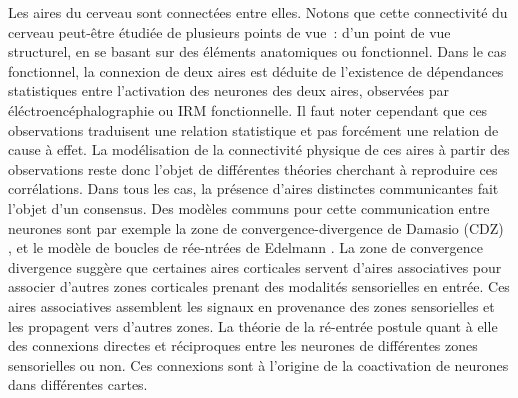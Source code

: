 \documentclass[../main]{subfiles}
\begin{document}
Les aires du cerveau sont connectées entre elles. Notons que cette connectivité du cerveau peut-être étudiée de plusieurs points de vue~: d'un point de vue structurel, en se basant sur des éléments anatomiques ou fonctionnel.
Dans le cas fonctionnel, la connexion de deux aires est déduite de l'existence de dépendances statistiques entre l'activation des neurones des deux aires, observées par éléctroencéphalographie ou IRM fonctionnelle. Il faut noter cependant que ces observations traduisent une relation statistique et pas forcément une relation de cause à effet. 
La modélisation de la connectivité physique de ces aires à partir des observations reste donc l'objet de différentes théories cherchant à reproduire ces corrélations. 
Dans tous les cas, la présence d'aires distinctes communicantes fait l'objet d'un consensus.
Des modèles communs pour cette communication entre neurones sont par exemple la zone de convergence-divergence de Damasio (CDZ) \cite{damasio_time-locked_1989}, et le modèle de boucles de rée-ntrées de Edelmann \cite{Edelman1982GroupSA}.
La zone de convergence divergence suggère que certaines aires corticales servent d'aires associatives pour associer d'autres zones corticales prenant des modalités sensorielles en entrée. Ces aires associatives assemblent les signaux en provenance des zones sensorielles et les propagent vers d'autres zones. 
La théorie de la ré-entrée postule quant à elle des connexions directes et réciproques entre les neurones de différentes zones sensorielles ou non. Ces connexions sont à l'origine de la coactivation de neurones dans différentes cartes.

\end{document}
